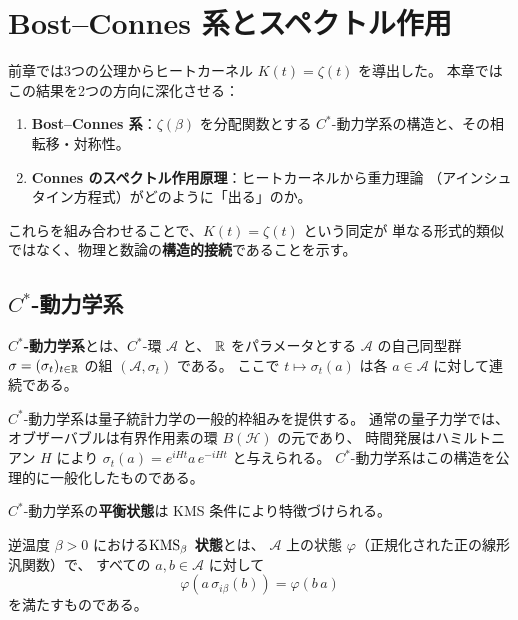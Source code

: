 \chapter{Bost--Connes 系とスペクトル作用}
\label{ch:bost-connes}

前章では3つの公理からヒートカーネル $K(t) = \zeta(t)$ を導出した。
本章ではこの結果を2つの方向に深化させる：
\begin{enumerate}
  \item \textbf{Bost--Connes 系}：$\zeta(\beta)$ を分配関数とする
        $C^*$-動力学系の構造と、その相転移・対称性。
  \item \textbf{Connes のスペクトル作用原理}：ヒートカーネルから重力理論
        （アインシュタイン方程式）がどのように「出る」のか。
\end{enumerate}
これらを組み合わせることで、$K(t) = \zeta(t)$ という同定が
単なる形式的類似ではなく、物理と数論の\textbf{構造的接続}であることを示す。


\section{$C^*$-動力学系}
\label{sec:cstar-dynamics}

\begin{definition}[$C^*$-動力学系]
\label{def:cstar-dynamics}
\textbf{$C^*$-動力学系}とは、$C^*$-環 $\mathcal{A}$ と、
$\mathbb{R}$ をパラメータとする $\mathcal{A}$ の自己同型群
$\sigma = (\sigma_t)_{t \in \mathbb{R}}$ の組 $(\mathcal{A}, \sigma_t)$ である。
ここで $t \mapsto \sigma_t(a)$ は各 $a \in \mathcal{A}$ に対して連続である。
\end{definition}

$C^*$-動力学系は量子統計力学の一般的枠組みを提供する。
通常の量子力学では、オブザーバブルは有界作用素の環 $B(\mathcal{H})$ の元であり、
時間発展はハミルトニアン $H$ により
$\sigma_t(a) = e^{iHt} a\, e^{-iHt}$ と与えられる。
$C^*$-動力学系はこの構造を公理的に一般化したものである。

$C^*$-動力学系の\textbf{平衡状態}は KMS 条件により特徴づけられる。

\begin{definition}[KMS 状態]
\label{def:KMS}
逆温度 $\beta > 0$ における\textbf{$\mathrm{KMS}_\beta$ 状態}とは、
$\mathcal{A}$ 上の状態 $\varphi$（正規化された正の線形汎関数）で、
すべての $a, b \in \mathcal{A}$ に対して
\begin{equation}
  \varphi(a\, \sigma_{i\beta}(b)) = \varphi(b\, a)
  \label{eq:KMS}
\end{equation}
を満たすものである。
\end{definition}

